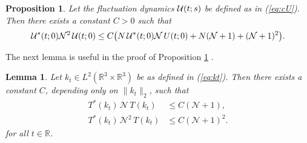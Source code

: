 \documentclass[11pt,a4paper]{article}
\newtheorem{cor}[thm]{Corollary}
\newtheorem{proposition}[thm]{Proposition}
\newtheorem{lemma}[thm]{Lemma}
\newtheorem*{rem}{Remark}
\newcommand{\cU}{{\cal U}}
\newcommand{\bR}{{\mathbb R}}
\newcommand{\R}{\mathbb{R}}
\newcommand{\N}{\mathcal{N}}
\newcommand{\K}{\mathcal{K}}
\newcommand{\fock}{\mathcal{F}}		%
\newcommand{\Ncal}{\mathcal{N}}		%
\newcommand{\scal}[2]{\big<#1,#2\big>} %
\newcommand{\norm}[1]{\lVert#1\rVert}	%
\newcommand{\bd}{\begin{displaymath}}			%
\newcommand{\ed}{\end{displaymath}}
\begin{document}
\begin{proposition} \label{prop:apri}
Let the fluctuation dynamics $\cU (t;s)$ be defined as in (\ref{eq:cU}). Then there exists a constant $C > 0$ such that
 \[ \cU^* (t;0) \N^2 \, \cU (t;0) \le C \big( N  \, \cU^* (t;0) \N \, U (t;0) + N (\N+1) + (\N+1)^2 \big).
 \]
\end{proposition}

The next lemma is useful in the proof of Proposition \ref{prop:apri} .
\begin{lemma} \label{lm:TNT}
Let $k_t \in L^2(\R^3 \times \R^3)$ be as defined in (\ref{eq:kt}). Then there exists a constant $C$, depending only on $\| k_t \|_2$, such that
\begin{align}
    T^* (k_t)  \, \N \, T (k_t) & \le C (\N+1), \label{eq:TNT} \\
    T^* (k_t) \, \N^2 \, T (k_t) & \le C (\N+1)^2. \label{eq:TN2T} %
  \end{align}
for all $t \in \bR$.
\end{lemma}


\end{document}
